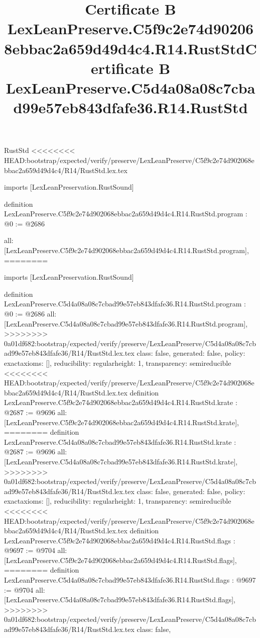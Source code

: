 \begin{lexlean}{RustStd}
<<<<<<<< HEAD:bootstrap/expected/verify/preserve/LexLeanPreserve/C5f9c2e74d902068ebbac2a659d49d4c4/R14/RustStd.lex.tex
\title{Certificate B LexLeanPreserve.C5f9c2e74d902068ebbac2a659d49d4c4.R14.RustStd}
\begin{coremodule}
imports [LexLeanPreservation.RustSound]

definition LexLeanPreserve.C5f9c2e74d902068ebbac2a659d49d4c4.R14.RustStd.program : @0 := @2686 {
  all: [LexLeanPreserve.C5f9c2e74d902068ebbac2a659d49d4c4.R14.RustStd.program],
========
\title{Certificate B LexLeanPreserve.C5d4a08a08c7cbad99e57eb843dfafe36.R14.RustStd}
\begin{coremodule}
imports [LexLeanPreservation.RustSound]

definition LexLeanPreserve.C5d4a08a08c7cbad99e57eb843dfafe36.R14.RustStd.program : @0 := @2686 {
  all: [LexLeanPreserve.C5d4a08a08c7cbad99e57eb843dfafe36.R14.RustStd.program],
>>>>>>>> 0a01df682:bootstrap/expected/verify/preserve/LexLeanPreserve/C5d4a08a08c7cbad99e57eb843dfafe36/R14/RustStd.lex.tex
  class: false,
  generated: false,
  policy: exact{axioms: []},
  reducibility: regular{height: 1},
  transparency: semireducible
}
<<<<<<<< HEAD:bootstrap/expected/verify/preserve/LexLeanPreserve/C5f9c2e74d902068ebbac2a659d49d4c4/R14/RustStd.lex.tex
definition LexLeanPreserve.C5f9c2e74d902068ebbac2a659d49d4c4.R14.RustStd.krate : @2687 := @9696 {
  all: [LexLeanPreserve.C5f9c2e74d902068ebbac2a659d49d4c4.R14.RustStd.krate],
========
definition LexLeanPreserve.C5d4a08a08c7cbad99e57eb843dfafe36.R14.RustStd.krate : @2687 := @9696 {
  all: [LexLeanPreserve.C5d4a08a08c7cbad99e57eb843dfafe36.R14.RustStd.krate],
>>>>>>>> 0a01df682:bootstrap/expected/verify/preserve/LexLeanPreserve/C5d4a08a08c7cbad99e57eb843dfafe36/R14/RustStd.lex.tex
  class: false,
  generated: false,
  policy: exact{axioms: []},
  reducibility: regular{height: 1},
  transparency: semireducible
}
<<<<<<<< HEAD:bootstrap/expected/verify/preserve/LexLeanPreserve/C5f9c2e74d902068ebbac2a659d49d4c4/R14/RustStd.lex.tex
definition LexLeanPreserve.C5f9c2e74d902068ebbac2a659d49d4c4.R14.RustStd.flags : @9697 := @9704 {
  all: [LexLeanPreserve.C5f9c2e74d902068ebbac2a659d49d4c4.R14.RustStd.flags],
========
definition LexLeanPreserve.C5d4a08a08c7cbad99e57eb843dfafe36.R14.RustStd.flags : @9697 := @9704 {
  all: [LexLeanPreserve.C5d4a08a08c7cbad99e57eb843dfafe36.R14.RustStd.flags],
>>>>>>>> 0a01df682:bootstrap/expected/verify/preserve/LexLeanPreserve/C5d4a08a08c7cbad99e57eb843dfafe36/R14/RustStd.lex.tex
  class: false,
}}}
\end{coremodule}}
\end{coremodule}
\end{lexlean}
